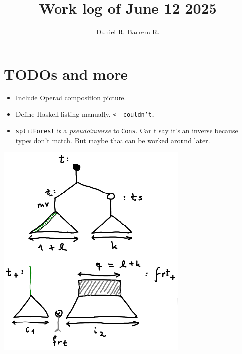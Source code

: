 \documentclass{amsart}
\title{Work log of June 12 2025}
\author{Daniel R. Barrero R.}
\begin{document}
\maketitle

\section{TODOs and more}

\begin{itemize}
	\item Include Operad composition picture.
	\item Define Haskell listing manually. \texttt{<-- couldn't.}
	\item \texttt{splitForest} is a \emph{pseudoinverse} to \texttt{Cons}.
		Can't say it's an inverse because types don't match. But maybe
		that can be worked around later.
\end{itemize}

\newpage



\newpage

\includegraphics[width=0.7\textwidth]{bigPic.png}
\end{document}
